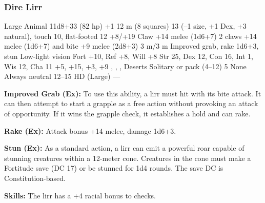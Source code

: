 \subsubsection{Dire Lirr}
\begin{MonsterStats}
{Large Animal}
{11d8+33 (82 hp)}
{+1}
{12 m (8 squares)}
{13 (--1 size, +1 Dex, +3 natural), touch 10, flat-footed 12}
{+8/+19}
{Claw +14 melee (1d6+7)}
{2 claws +14 melee (1d6+7) and bite +9 melee (2d8+3)}
{3 m/3 m}
{Improved grab, rake 1d6+3, stun}
{Low-light vision}
{Fort +10, Ref +8, Will +8}
{Str 25, Dex 12, Con 16, Int 1, Wis 12, Cha 11}
{ +5,  +15,  +3,  +9}
{, , , }
{Deserts}
{Solitary or pack (4--12)}
{5}
{None}
{Always neutral}
{12--15 HD (Large)}
{---}
\end{MonsterStats}

\textbf{Improved Grab (Ex):} To use this ability, a lirr must hit with its bite attack. It can then attempt to start a grapple as a free action without provoking an attack of opportunity. If it wins the grapple check, it establishes a hold and can rake.

\textbf{Rake (Ex):} Attack bonus +14 melee, damage 1d6+3.

\textbf{Stun (Ex):} As a standard action, a lirr can emit a powerful roar capable of stunning creatures within a 12-meter cone. Creatures in the cone must make a Fortitude save (DC 17) or be stunned for 1d4 rounds. The save DC is Constitution-based.

\textbf{Skills:} The lirr has a +4 racial bonus to  checks.
